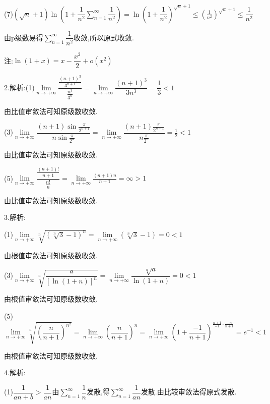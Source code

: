 (7)$(\sqrt n  + 1)\ln (1 + \dfrac{1}{{{n^2}}}\sum\limits_{n = 1}^\infty  {\dfrac{1}{{{n^2}}}} ) = \ln {(1 + \dfrac{1}{{{n^2}}})^{\sqrt n  + 1}} \leqslant {\left( {\frac{1}{{{n^2}}}} \right)^{\sqrt n  + 1}} \leqslant \dfrac{1}{{{n^2}}}$

由p级数易得$\sum\limits_{n = 1}^\infty  {\dfrac{1}{{{n^2}}}} $收敛,所以原式收敛.

注:$\ln (1 + x) = x - \dfrac{{{x^2}}}{2} + o({x^2})$

2.解析:(1)$\lim\limits_{n \to +\infty} \dfrac{{\frac{{{{(n + 1)}^3}}}{{{3^{n + 1}}}}}}{{\frac{{{n^3}}}{{{3^n}}}}} = \lim\limits_{n \to +\infty} \dfrac{{{{(n + 1)}^3}}}{{3{n^3}}} = \dfrac{1}{3} < 1$

由比值审敛法可知原级数收敛.

(3)$\lim\limits_{n \to +\infty} \dfrac{{(n + 1)\sin \frac{\pi }{{{2^{n + 1}}}}}}{{n\sin \frac{\pi }{{{2^n}}}}} = \lim\limits_{n \to +\infty} \dfrac{{(n + 1)\frac{\pi }{{{2^{n + 1}}}}}}{{n\frac{\pi }{{{2^n}}}}} = \frac{1}{2} < 1$

由比值审敛法可知原级数收敛.

(5)$\lim\limits_{n \to +\infty} \dfrac{{\frac{{(n + 1)!}}{{n + 1}}}}{{\frac{{n!}}{n}}} = \lim\limits_{n \to +\infty} \frac{{(n + 1)n}}{{n + 1}} = \infty  > 1$

由比值审敛法可知原级数收敛.

3.解析:

(1)$\lim\limits_{n \to +\infty} \sqrt[n]{{{{(\sqrt[n]{3} - 1)}^n}}} = \lim\limits_{n \to +\infty} \left( {\sqrt[n]{3} - 1} \right) = 0 < 1$

由根值审敛法可知原级数收敛.

(3)$\lim\limits_{n \to +\infty} \sqrt[n]{{\dfrac{a}{{{{[\ln (1 + n)]}^n}}}}} = \lim\limits_{n \to +\infty} \dfrac{{\sqrt[n]{a}}}{{\ln (1 + n)}} = 0 < 1$

由根值审敛法可知原级数收敛.

(5)$\lim\limits_{n \to +\infty} \sqrt[n]{{{{\left( {\dfrac{n}{{n + 1}}} \right)}^{{n^2}}}}} = \lim\limits_{n \to +\infty} {\left( {\dfrac{n}{{n + 1}}} \right)^n} = \lim\limits_{n \to +\infty} {\left( {1 + \dfrac{{ - 1}}{{n + 1}}} \right)^{\frac{{n + 1}}{{ - 1}} \cdot \frac{{ - n}}{{n + 1}}}} = {e^{ - 1}} < 1$

由根值审敛法可知原级数收敛.

4.解析:

(1)$\dfrac{1}{{an + b}} > \dfrac{1}{{an}}$由$\sum\limits_{n = 1}^\infty  {\dfrac{1}{n}} $发散,得$\sum\limits_{n = 1}^\infty  {\dfrac{1}{{an}}} $发散.由比较审敛法得原式发散.

